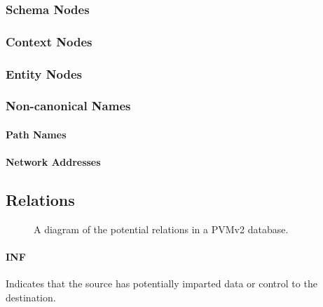 \documentclass[12pt,twoside,a4paper]{article}
\begin{document}
\subsubsection{Schema Nodes}

\subsubsection{Context Nodes}

\subsubsection{Entity Nodes}

\subsubsection{Non-canonical Names}

\paragraph{Path Names}

\paragraph{Network Addresses}

\subsection{Relations}

\begin{figure}[!h]
\centering
{}
\caption{A diagram of the potential relations in a PVMv2 database.}
\end{figure}

\paragraph{INF}
Indicates that the source has potentially imparted data or control to the destination.
\end{document}
